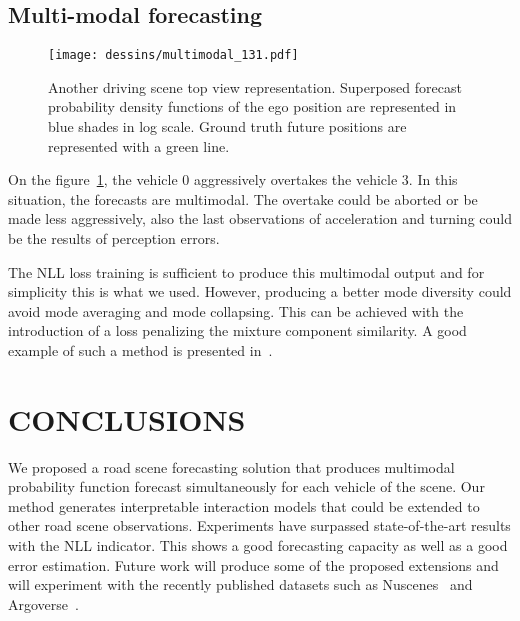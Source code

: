 \documentclass[a4paper, 10pt, conference]{ieeeconf}      %
\begin{document}
\subsection{Multi-modal forecasting}

\begin{figure}[ht]
        \centering
        \texttt{[image: dessins/multimodal\_131.pdf]}
        \vspace{-10pt}
        \caption{
        Another driving scene top view representation.
        Superposed forecast probability density functions of the ego position
        are represented in blue shades in log scale.
        Ground truth future positions are represented with a green line.
        }
        \label{fig_multimod}
        \vspace{-10pt}
\end{figure}


On the figure~\ref{fig_multimod}, the vehicle 0 aggressively overtakes the vehicle 3.
In this situation, the forecasts are multimodal.
The overtake could be aborted or be made less aggressively, also the last observations of
acceleration and turning could be the results of perception errors.


The NLL loss training is sufficient to produce this multimodal output and for simplicity this is what we used.
However, producing a better mode diversity could avoid mode averaging and mode collapsing.
This can be achieved with the introduction of a loss penalizing the mixture component similarity.
A good example of such a method is presented in~\cite{Yuan2019}.



\section{CONCLUSIONS}

We proposed a road scene forecasting solution that produces multimodal probability function forecast
simultaneously for each vehicle of the scene.
Our method generates interpretable interaction models that could be extended to other road scene observations.
Experiments have surpassed state-of-the-art results with the NLL indicator.
This shows a good forecasting capacity as well as a good error estimation.
Future work will produce some of the proposed extensions and will experiment with the recently published datasets
such as Nuscenes~\cite{Nuscenes2019} and Argoverse~\cite{Chang2019}.
\end{document}
